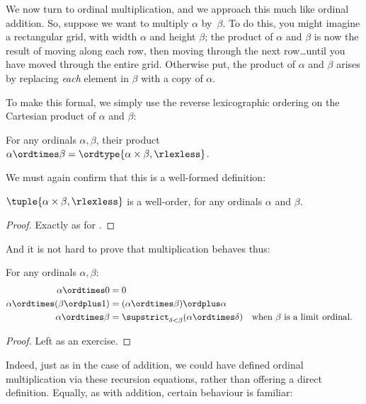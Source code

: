 \documentclass[../../../include/open-logic-section]{subfiles}
\begin{document}

We now turn to ordinal multiplication, and we approach this much like
ordinal addition. So, suppose we want to multiply $\alpha$ by~$\beta$.
To do this, you might imagine a rectangular grid, with width $\alpha$
and height $\beta$; the product of $\alpha$ and $\beta$ is now the
result of moving along each row, then moving through the next
row\ldots until you have moved through the entire grid. Otherwise put,
the product of $\alpha$ and $\beta$ arises by replacing \emph{each}
element in $\beta$ with a copy of $\alpha$.  

To make this formal, we simply use the reverse lexicographic ordering
on the Cartesian product of $\alpha$ and $\beta$:

\begin{defn}
For any ordinals $\alpha, \beta$, their product $\alpha \ordtimes \beta = \ordtype{\alpha \times \beta, \rlexless}$.
\end{defn}
\noindent
We must again confirm that this is a well-formed definition:

\begin{lem}
$\tuple{\alpha \times \beta, \rlexless}$ is a well-order, for any
ordinals $\alpha$ and $\beta$.
\end{lem}

\begin{proof}
Exactly as for .
\end{proof}
\noindent
And it is not hard to prove that multiplication behaves thus:

\begin{lem}
For any ordinals $\alpha, \beta$:
\begin{align*}
	\alpha \ordtimes 0 &= 0\\
	\alpha \ordtimes (\beta \ordplus 1) &= 
		(\alpha \ordtimes \beta) \ordplus \alpha\\
	\alpha  \ordtimes \beta &= 
		\supstrict_{\delta < \beta}(\alpha \ordtimes \delta) && 
		\text{when $\beta$ is a limit ordinal}.
\end{align*}
\end{lem}

\begin{proof}
Left as an exercise.
\end{proof}

Indeed, just as in the case of addition, we could have defined ordinal
multiplication via these recursion equations, rather than offering a
direct definition. Equally, as with addition, certain behaviour is
familiar:
\end{document}

